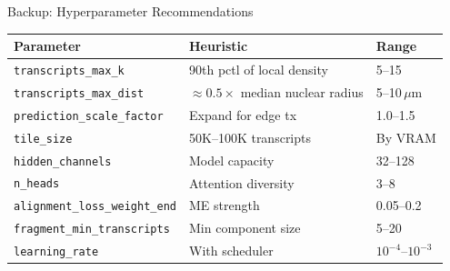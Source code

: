 \documentclass[aspectratio=169,10pt]{beamer}
\begin{document}
\appendix

\begin{frame}{Backup: Hyperparameter Recommendations}

\begin{center}
\renewcommand{\arraystretch}{1.2}
{\small
\begin{tabular}{@{}l l l@{}}
\toprule
\textbf{Parameter} & \textbf{Heuristic} & \textbf{Range} \\
\midrule
\texttt{transcripts\_max\_k} & 90th pctl of local density & 5--15 \\
\texttt{transcripts\_max\_dist} & $\approx 0.5\times$ median nuclear radius & 5--10\,$\mu$m \\
\texttt{prediction\_scale\_factor} & Expand for edge tx & 1.0--1.5 \\
\texttt{tile\_size} & 50K--100K transcripts & By VRAM \\
\texttt{hidden\_channels} & Model capacity & 32--128 \\
\texttt{n\_heads} & Attention diversity & 3--8 \\
\texttt{alignment\_loss\_weight\_end} & ME strength & 0.05--0.2 \\
\texttt{fragment\_min\_transcripts} & Min component size & 5--20 \\
\texttt{learning\_rate} & With scheduler & $10^{-4}$--$10^{-3}$ \\
\bottomrule
\end{tabular}
}
\end{center}
\end{frame}
\end{document}
